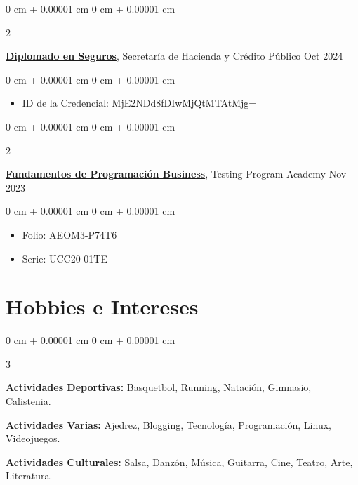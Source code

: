 \documentclass[10pt, letterpaper]{article}
\newenvironment{highlights}{
    \begin{itemize}[
        topsep=0.10 cm,
        parsep=0.10 cm,
        partopsep=0pt,
        itemsep=0pt,
        leftmargin=0 cm + 10pt
    ]
}{
    \end{itemize}
} %
\newenvironment{onecolentry}{
    \begin{adjustwidth}{
        0 cm + 0.00001 cm
    }{
        0 cm + 0.00001 cm
    }
}{
    \end{adjustwidth}
} %
\newenvironment{twocolentry}[2][]{
    \onecolentry
    \def\secondColumn{#2}
    \setcolumnwidth{\fill, 4.5 cm}
    \begin{paracol}{2}
}{
    \switchcolumn \raggedleft \secondColumn
    \end{paracol}
    \endonecolentry
} %
\newenvironment{threecolentry}[3][]{
    \onecolentry
    \def\thirdColumn{#3}
    \setcolumnwidth{, \fill, 4.5 cm}
    \begin{paracol}{3}
    {\raggedright #2} \switchcolumn
}{
    \switchcolumn \raggedleft \thirdColumn
    \end{paracol}
    \endonecolentry
} %
\begin{document}
        \vspace{0.10 cm}
        
        \begin{twocolentry}{
            Oct 2024
        }
            \href{https://diplomadoenseguros.condusef.gob.mx/qr_verifica.php?ida=21647&idg=3}{\textbf{Diplomado en Seguros}}, Secretaría de Hacienda y Crédito Público\end{twocolentry}

        \vspace{0.10 cm}
        \begin{onecolentry}
            \begin{highlights}
                \item ID de la Credencial: MjE2NDd8fDIwMjQtMTAtMjg=
            \end{highlights}
        \end{onecolentry}

        \begin{twocolentry}{
            Nov 2023
        }
            \href{https://testingprogram.com.mx/validar/}{\textbf{Fundamentos de Programación Business}}, Testing Program Academy\end{twocolentry}

        \vspace{0.10 cm}
        \begin{onecolentry}
            \begin{highlights}
                \item Folio: AEOM3-P74T6
                \item Serie: UCC20-01TE
            \end{highlights}
        \end{onecolentry}

 \section{Hobbies e Intereses}

\begin{threecolentry}{
    \textbf{Actividades Deportivas:} Basquetbol, Running, Natación, Gimnasio, Calistenia.
}{
    \textbf{Actividades Culturales:} Salsa, Danzón, Música, Guitarra, Cine, Teatro, Arte, Literatura. 
}{
    \textbf{Actividades Varias:} Ajedrez, Blogging, Tecnología, Programación, Linux, Videojuegos.
}
\end{threecolentry}
\end{document}
